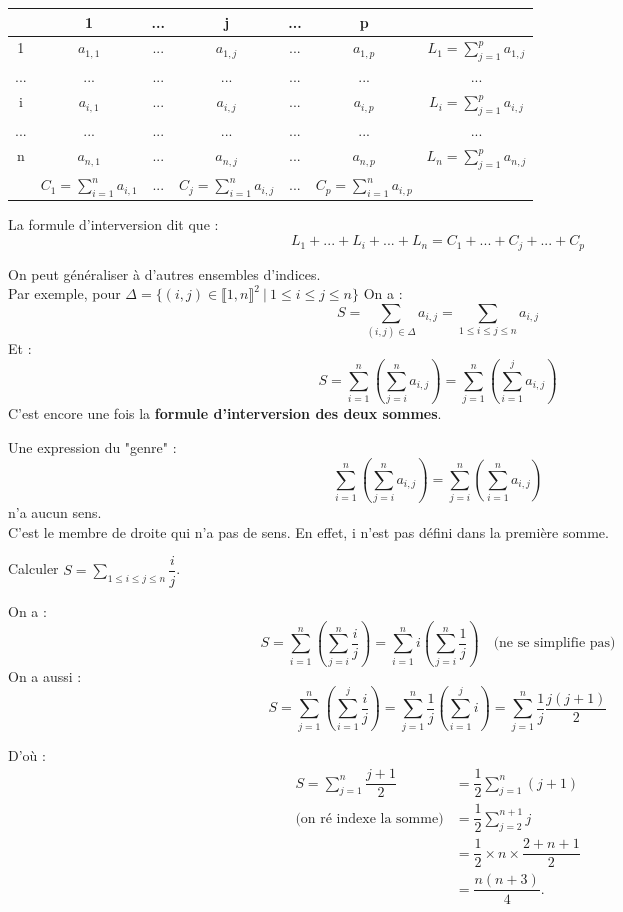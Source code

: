 \documentclass[a4paper,11pt]{article}
\newcommand{\intN}[2]{\llbracket #1, #2 \rrbracket}
\newcommand{\ens}[1]{\{#1\}}
\newcommand{\encadLEQ}[3]{#1 \leq #2 \leq #3}
\newcommand{\mot}[1]{\textcolor{bordeaux}{\textbf{#1}}}
\begin{document}
\begin{center}
	\begin{tabular}{|c|ccccc|c|}
		\hline
		& 1 & ... & j & ... & p & \\
		\hline
		1 & $a_{1, 1}$ & ... & $a_{1, j}$ & ... & $a_{1, p}$ & $L_1 = \sum_{j=1}^{p}a_{1, j}$ \\
		... & ... & ... & ... & ... & ... & ... \\
		i & $a_{i, 1}$ & ... & $a_{i, j}$ & ... & $a_{i, p}$ & $L_i = \sum_{j=1}^{p}a_{i, j}$ \\
		... & ... & ... & ... & ... & ... & ... \\
		n & $a_{n, 1}$ & ... & $a_{n, j}$ & ... & $a_{n, p}$ & $L_n = \sum_{j=1}^{p}a_{n, j}$ \\
		\hline
		& $C_1 = \sum_{i=1}^{n}a_{i, 1}$ & ... & $C_j = \sum_{i=1}^{n}a_{i, j}$ & ... & $C_p = \sum_{i=1}^{n}a_{i, p}$ & \\
		\hline
	\end{tabular}
\end{center}

La formule d'interversion dit que :
$$L_1 + ... + L_i + ... + L_n = C_1 + ... + C_j + ... + C_p$$

On peut généraliser à d'autres ensembles d'indices.\\
Par exemple, pour $\Delta = \ens{(i, j)\in\intN{1}{n}^2 \: | \: \encadLEQ{1}{i \leq j}{n}}$
On a :
$$S = \sum_{(i, j)\in\Delta}a_{i, j} = \sum_{\encadLEQ{1}{i \leq j}{n}}a_{i, j}$$
Et :
$$S = \sum_{i=1}^{n}(\sum_{j=i}^{n}a_{i, j}) = \sum_{j=1}^{n}(\sum_{i=1}^{j}a_{i, j})$$
C'est encore une fois la \mot{formule d'interversion des deux sommes}.

\newpage
\begin{remarque}
	Une expression du "genre" :
	$$\sum_{i=1}^{n}(\sum_{j=i}^{n}a_{i, j}) = \sum_{j=i}^{n}(\sum_{i=1}^{n}a_{i, j})$$
	n'a aucun sens. \\
	C'est le membre de droite qui n'a pas de sens. En effet, i n'est pas défini dans la première somme.
\end{remarque}

\begin{exemples}
	Calculer $S = \sum_{\encadLEQ{1}{i \leq j}{n}}\dfrac{i}{j}$.
	
	On a :
	$$S = \sum_{i=1}^{n}(\sum_{j=i}^{n}\dfrac{i}{j}) = \sum_{i=1}^{n}i(\sum_{j=i}^{n}\dfrac{1}{j}) \quad \text{(ne se simplifie pas)}$$
	On a aussi :
	$$S = \sum_{j=1}^{n}(\sum_{i=1}^{j}\dfrac{i}{j}) = \sum_{j=1}^{n}\dfrac{1}{j}(\sum_{i=1}^{j}i) = \sum_{j=1}^{n}\dfrac{1}{j}\dfrac{j(j+1)}{2}$$
	
	D'où :
	\begin{align*}
		S = \sum_{j=1}^{n}\dfrac{j+1}{2} &= \dfrac{1}{2}\sum_{j=1}^{n}(j+1) \\
		\text{(on ré indexe la somme)}&= \dfrac{1}{2}\sum_{j=2}^{n+1}j \\
		&= \dfrac{1}{2} \times n \times \dfrac{2 + n + 1}{2} \\
		&= \dfrac{n(n+3)}{4}.
	\end{align*}
\end{exemples}
\end{document}
